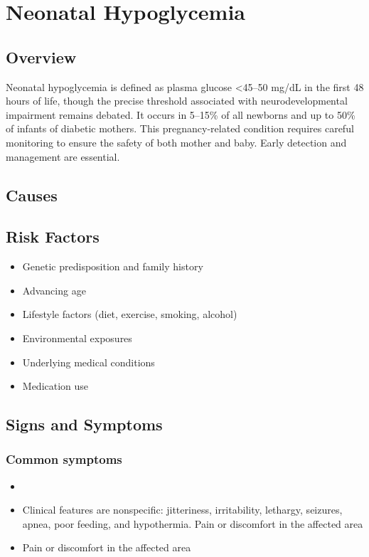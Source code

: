 \chapter{Neonatal Hypoglycemia}
\label{sec:Neonatal Hypoglycemia}

\section{Overview}
Neonatal hypoglycemia is defined as plasma glucose <45--50 mg/dL in the first 48 hours of life, though the precise threshold associated with neurodevelopmental impairment remains debated. It occurs in 5--15\% of all newborns and up to 50\% of infants of diabetic mothers. This pregnancy-related condition requires careful monitoring to ensure the safety of both mother and baby. Early detection and management are essential.
\section{Causes}
\section{Risk Factors}

\begin{itemize}[noitemsep]
  \item Genetic predisposition and family history
  \item Advancing age
  \item Lifestyle factors (diet, exercise, smoking, alcohol)
  \item Environmental exposures
  \item Underlying medical conditions
  \item Medication use
\end{itemize}
\section{Signs and Symptoms}

\subsection{Common symptoms}
\begin{itemize}[noitemsep]
  \item \item Clinical features are nonspecific: jitteriness, irritability, lethargy, seizures, apnea, poor feeding, and hypothermia. Pain or discomfort in the affected area    \item Pain or discomfort in the affected area
  \end{itemize}

